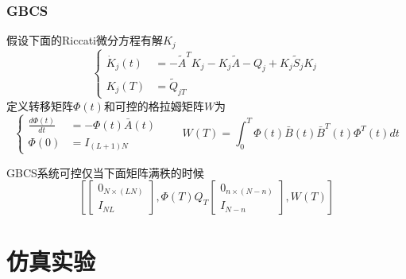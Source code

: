 \documentclass[UTF8, aspectratio=169, 9pt]{ctexbeamer}
\begin{document}
\begin{frame}
\frametitle{GBCS}
假设下面的Riccati微分方程有解$K_j$
$$
\left\{\begin{aligned}
\dot{K}_{j}(t) &=-\widetilde{A}^{T} K_{j}-K_{j} \widetilde{A}-Q_{j}+K_{j} \widetilde{S}_{j} K_{j} \\
K_{j}(T) &=\widetilde{Q}_{j T}
\end{aligned}\right.
$$
定义转移矩阵$\Phi(t)$和可控的格拉姆矩阵$W$为
$$
\left\{\begin{aligned}
\frac{d \Phi(t)}{d t} &=-\Phi(t) \bar{A}(t) \\
\Phi(0) &=I_{(L+1) N}
\end{aligned}\right.
\qquad 
W(T)=\int_{0}^{T} \Phi(t) \bar{B}(t) \bar{B}^{T}(t) \Phi^{T}(t) d t
$$

\begin{theorem}
  GBCS系统可控仅当下面矩阵满秩的时候
  $$
  \left[\left[\begin{array}{c}
    0_{N \times(L N)} \\
    I_{N L}
    \end{array}\right], \Phi(T) Q_{T}\left[\begin{array}{c}
    0_{n \times(N-n)} \\
    I_{N-n}
    \end{array}\right], W(T)\right]
  $$
\end{theorem}
\end{frame}

\section{仿真实验}
\begin{frame}



\end{frame}

\begin{frame}
\end{frame}
\end{document}
